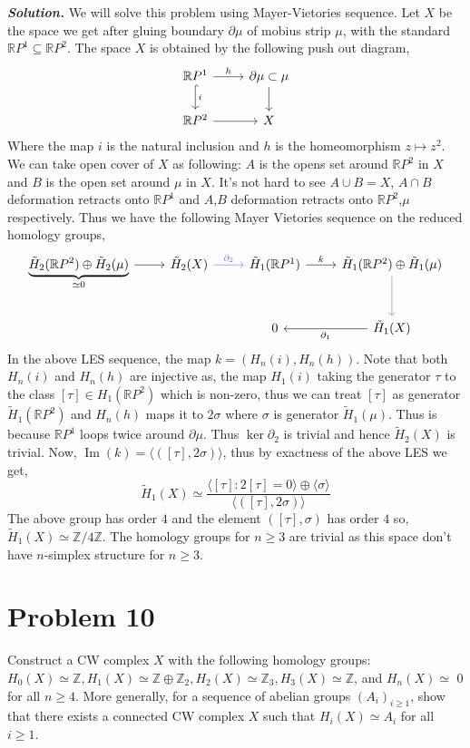 \documentclass[11pt]{article}
\newcommand{\bb}[1]{\mathbb{#1}}
\newcommand{\Z}{\bb{Z}}
\newcommand{\R}{\mathbb{R}}
\newcommand{\p}{\partial}
\newcommand{\sol}{ \textbf{\textit{Solution.}} }
\newcommand{\htt}{\tilde{H}}
\begin{document}
 \sol We will solve this problem using Mayer-Vietories sequence. Let $X$ be the space we get after gluing boundary $\p \mu$ of mobius strip $\mu$, with the standard $\R P^1\subseteq \R P^2$. The space $X$ is obtained by the following push out diagram, \[\begin{tikzcd}
	{\R P^1} & {\p \mu \subset\mu} \\
	{\R P^2} & X
	\arrow["i", hook, from=1-1, to=2-1]
	\arrow["h", from=1-1, to=1-2]
	\arrow[from=1-2, to=2-2]
	\arrow[from=2-1, to=2-2]
\end{tikzcd}\]
Where the map $i$ is the natural inclusion and $h$ is the homeomorphism $z \mapsto z^2$. We can take open cover of $X$ as following: $A$ is the opens set around $\R P^2$ in $X$ and $B$ is the open set around $\mu$ in $X$. It's not hard to see $A \cup B = X$, $A \cap B$ deformation retracts onto $\R P^1$ and $A$,$B$ deformation retracts onto $\R P^2$,$\mu$ respectively. Thus we have the following Mayer Vietories sequence on the reduced homology groups,
\[\begin{tikzcd}
	{\underbrace{\htt_2(\R P^2) \oplus \htt_2(\mu)}_{\simeq 0}} & {\htt_2(X)} & {\htt_1(\R P^1)} & {\htt_1(\R P^2)\oplus\htt_1(\mu)} \\
	&& 0 & {\htt_1(X)}
	\arrow[from=1-1, to=1-2]
	\arrow["{\p_2}", color={rgb,255:red,153;green,92;blue,214}, from=1-2, to=1-3]
	\arrow["k", from=1-3, to=1-4]
	\arrow[color={rgb,255:red,153;green,92;blue,214}, from=1-4, to=2-4]
	\arrow["{\p_1}", from=2-4, to=2-3]
\end{tikzcd}\]
In the above LES sequence, the map $k= (H_n(i),H_n(h))$. Note that both $H_n(i)$ and $H_n(h)$ are injective as, the map $H_1(i)$ taking the generator $\tau$ to the class $[\tau] \in H_1(\R P^2)$ which is non-zero, thus we can treat $[\tau]$ as generator $\htt_1(\R P^2)$ and $H_n(h)$ maps it to $2\sigma$ where $\sigma$ is generator $\htt_1(\mu)$. Thus is because $\R P^1$ loops twice around $\p \mu$. Thus $\ker \p_2$ is trivial and hence $\htt_2(X)$ is trivial. Now, $\operatorname{Im}(k) =\langle ([\tau], 2\sigma)\rangle$, thus by exactness of the above LES we get, $$\tilde{H}_1(X) \simeq \frac{\langle{[\tau] : 2[\tau]=0}\rangle \oplus \langle\sigma\rangle}{\langle ([\tau], 2\sigma)\rangle}$$
The above group has order $4$ and the element $([\tau],\sigma)$ has order $4$ so, $\htt_1(X) \simeq \Z/4\Z$. The homology groups for $n \geq 3$ are trivial as this space don't have $n$-simplex structure for $n \geq 3$.

 \section{Problem 10}
 \begin{prob}{}{}
    Construct a CW complex $X$ with the following homology groups: $H_{0}(X) \simeq \mathbb{Z}, H_{1}(X) \simeq \mathbb{Z} \oplus \mathbb{Z}_{2}, H_{2}(X) \simeq \mathbb{Z}_{3}, H_{3}(X) \simeq \mathbb{Z}$, and $H_{n}(X) \simeq$ 0 for all $n \geq 4$. More generally, for a sequence of abelian groups $\left(A_{i}\right)_{i \geq 1}$, show that there exists a connected CW complex $X$ such that $H_{i}(X) \simeq A_{i}$ for all $i \geq 1$.
 \end{prob}
\end{document}
